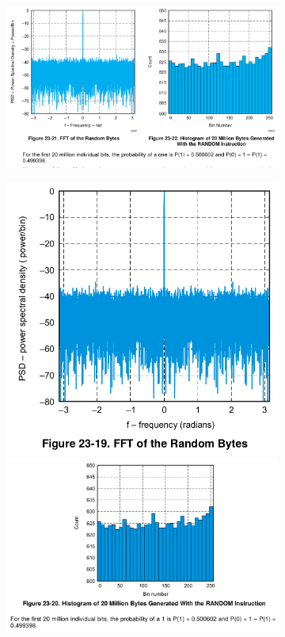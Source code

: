 \begin{figure}
\center
\caption{Seeding Result for CC253X and CC2538}
\begin{subfigure}{0.8\linewidth}
	\includegraphics[width=\linewidth]{./figures/CC253X_Seed.png}
\end{subfigure}

\begin{subfigure}{0.8\linewidth}
	\center
	\includegraphics[width=0.55\linewidth]{./figures/CC2538_Seed1.png}
	\includegraphics[width=\linewidth]{./figures/CC2538_Seed2.png}
\end{subfigure}
\label{CC2538_CC253X_SeedComparison}
\end{figure}

